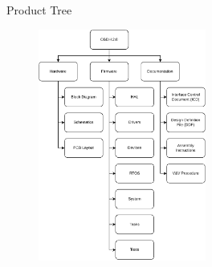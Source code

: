 
\begin{frame}{Product Tree}

    \begin{figure}[!ht]
        \begin{center}
            \includegraphics[width=5.5cm]{figures/product-tree}
        \end{center}
    \end{figure}

\end{frame}